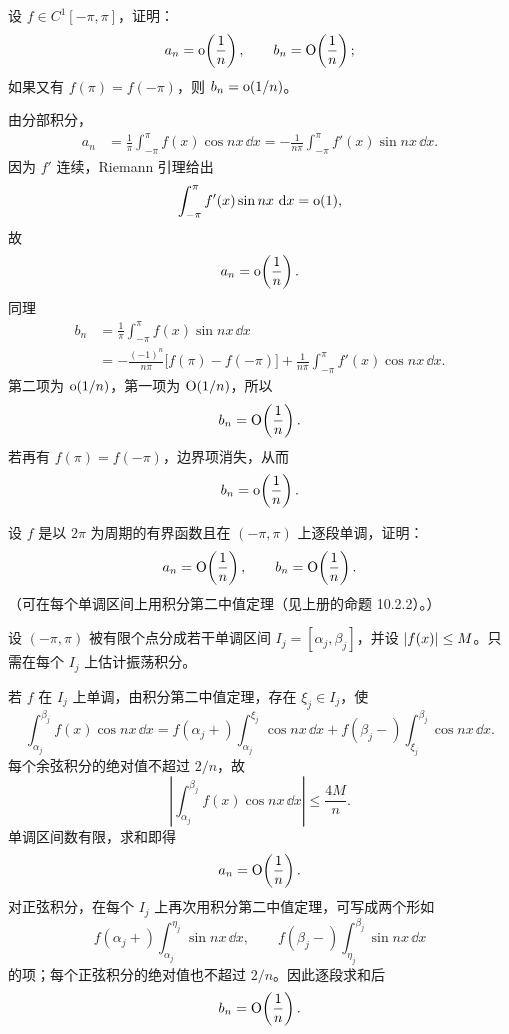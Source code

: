 \begin{xexercise}[4]
设 $f\in C^1[-\pi,\pi]$，证明：
  \[
    a_n=\mathrm{o}\!\left(\frac1n\right),\qquad b_n=\mathrm{O}\!\left(\frac1n\right);
  \]
  如果又有 $f(\pi)=f(-\pi)$，则 $b_n=\mathrm{o}(1/n)$。
\end{xexercise}
\begin{xsolution}
由分部积分，
\begin{align*}
  a_n
  &=\frac1\pi\int_{-\pi}^{\pi}f(x)\cos nx\,\dd x
   =-\frac1{n\pi}\int_{-\pi}^{\pi}f'(x)\sin nx\,\dd x.
\end{align*}
因为 $f'$ 连续，Riemann 引理给出
\[
  \int_{-\pi}^{\pi}f'(x)\sin nx\,\mathop{}\!\mathrm{d} x=\mathrm{o}(1),
\]
故
\[
  a_n=\mathrm{o}\!\left(\frac1n\right).
\]
同理
\begin{align*}
  b_n
  &=\frac1\pi\int_{-\pi}^{\pi}f(x)\sin nx\,\dd x\\
  &=-\frac{(-1)^n}{n\pi}\bigl[f(\pi)-f(-\pi)\bigr]
    +\frac1{n\pi}\int_{-\pi}^{\pi}f'(x)\cos nx\,\dd x.
\end{align*}
第二项为 $\mathrm{o}(1/n)$，第一项为 $\mathrm{O}(1/n)$，所以
\[
  b_n=\mathrm{O}\!\left(\frac1n\right).
\]
若再有 $f(\pi)=f(-\pi)$，边界项消失，从而
\[
  b_n=\mathrm{o}\!\left(\frac1n\right).
\]
\end{xsolution}


\begin{xexercise}[5]
设 $f$ 是以 $2\pi$ 为周期的有界函数且在 $(-\pi,\pi)$ 上逐段单调，证明：
  \[
    a_n=\mathrm{O}\!\left(\frac1n\right),\qquad b_n=\mathrm{O}\!\left(\frac1n\right).
  \]
  （可在每个单调区间上用积分第二中值定理（见上册的命题 10.2.2）。）
\end{xexercise}
\begin{xsolution}
设 $(-\pi,\pi)$ 被有限个点分成若干单调区间 $I_j=[\alpha_j,\beta_j]$，并设
$\lvert f(x)\rvert\le M$。只需在每个 $I_j$ 上估计振荡积分。

若 $f$ 在 $I_j$ 上单调，由积分第二中值定理，存在 $\xi_j\in I_j$，使
\[
  \int_{\alpha_j}^{\beta_j}f(x)\cos nx\,\dd x
  =f(\alpha_j+)\int_{\alpha_j}^{\xi_j}\cos nx\,\dd x
   +f(\beta_j-)\int_{\xi_j}^{\beta_j}\cos nx\,\dd x.
\]
每个余弦积分的绝对值不超过 $2/n$，故
\[
  \left|\int_{\alpha_j}^{\beta_j}f(x)\cos nx\,\dd x\right|
  \le\frac{4M}{n}.
\]
单调区间数有限，求和即得
\[
  a_n=\mathrm{O}\!\left(\frac1n\right).
\]
对正弦积分，在每个 $I_j$ 上再次用积分第二中值定理，可写成两个形如
\[
  f(\alpha_j+)\int_{\alpha_j}^{\eta_j}\sin nx\,\dd x,
  \qquad
  f(\beta_j-)\int_{\eta_j}^{\beta_j}\sin nx\,\dd x
\]
的项；每个正弦积分的绝对值也不超过 $2/n$。因此逐段求和后
\[
  b_n=\mathrm{O}\!\left(\frac1n\right).
\]
\end{xsolution}


